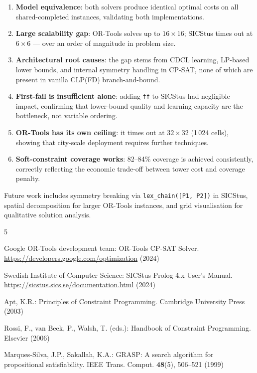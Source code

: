 \documentclass{llncs}
\begin{document}
\begin{enumerate}[leftmargin=*]
  \item \textbf{Model equivalence}: both solvers produce identical optimal
        costs on all shared-completed instances, validating both implementations.
  \item \textbf{Large scalability gap}: OR-Tools solves up to $16{\times}16$;
        SICStus times out at $6{\times}6$ --- over an order of magnitude in
        problem size.
  \item \textbf{Architectural root causes}: the gap stems from CDCL learning,
        LP-based lower bounds, and internal symmetry handling in CP-SAT, none
        of which are present in vanilla CLP(FD) branch-and-bound.
  \item \textbf{First-fail is insufficient alone}: adding \texttt{ff} to
        SICStus had negligible impact, confirming that lower-bound quality and
        learning capacity are the bottleneck, not variable ordering.
  \item \textbf{OR-Tools has its own ceiling}: it times out at $32{\times}32$
        (1\,024 cells), showing that city-scale deployment requires further
        techniques.
  \item \textbf{Soft-constraint coverage works}: 82--84\% coverage is achieved
        consistently, correctly reflecting the economic trade-off between tower
        cost and coverage penalty.
\end{enumerate}

Future work includes symmetry breaking via \texttt{lex\_chain([P1, P2])} in
SICStus, spatial decomposition for larger OR-Tools instances, and grid
visualisation for qualitative solution analysis.

\begin{thebibliography}{5}

Google OR-Tools development team:
OR-Tools CP-SAT Solver.
\url{https://developers.google.com/optimization} (2024)

Swedish Institute of Computer Science:
SICStus Prolog 4.x User's Manual.
\url{https://sicstus.sics.se/documentation.html} (2024)

Apt, K.R.:
Principles of Constraint Programming.
Cambridge University Press (2003)

Rossi, F., van Beek, P., Walsh, T. (eds.):
Handbook of Constraint Programming.
Elsevier (2006)

Marques-Silva, J.P., Sakallah, K.A.:
GRASP: A search algorithm for propositional satisfiability.
IEEE Trans. Comput. \textbf{48}(5), 506--521 (1999)

\end{thebibliography}
\end{document}
